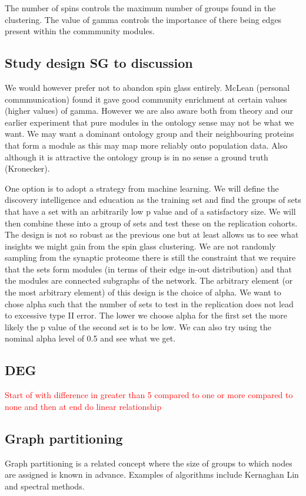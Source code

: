 The number of spins controls the maximum number of groups found in the clustering. The value of gamma controls the importance of there being edges present within the commmunity modules.


\subsection{Study design SG to discussion}
We would however prefer not to abandon spin glass entirely. McLean (personal commmunication) found it gave good community enrichment at certain values (higher values) of gamma. However we are also aware both from theory and our earlier experiment that pure modules in the ontology sense may not be what we want. We may want a dominant ontology group and their neighbouring proteins that form a module as this may map more reliably onto population data. Also although it is attractive the ontology group is in no sense a ground truth  (Kronecker).

One option is to adopt a strategy from machine learning. We will define the discovery intelligence and education as the training set and find the groups of sets that have a set with an arbitrarily low p value and of a satisfactory size. We will then combine these into a group of sets and test these on the replication cohorts. The design is not so robust as the previous one but at least allows us to see what insights we might gain from the spin glass clustering. We are not randomly sampling from the synaptic proteome there is still the constraint that we require that the sets form modules (in terms of their edge in-out distribution) and that the modules are connected subgraphs of the network. The arbitrary element (or the most arbitrary element) of this design is the choice of alpha. We want to chose alpha such that the number of sets to test in the replication does not lead to excessive type II error. The lower we choose alpha for the first set the more likely the p value of the second set is to be low. We can also try using the nominal alpha level of 0.5 and see what we get. 


\subsection{DEG}
\textcolor{red}{Start of with difference in greater than 5 compared to one or more compared to none and then at end do linear relationship}
\subsection{Graph partitioning}
Graph partitioning is a related concept where the size of groups to which nodes are assigned is known in advance. Examples of algorithms include Kernaghan Lin and spectral methods.

